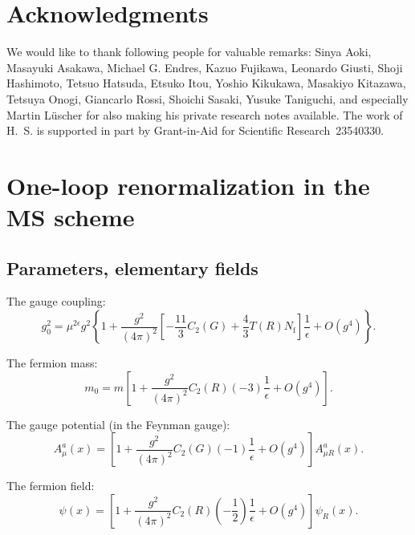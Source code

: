 \section*{Acknowledgments}
We would like to thank following people for valuable remarks:
Sinya Aoki,
Masayuki Asakawa,
Michael G. Endres,
Kazuo Fujikawa,
Leonardo Giusti,
Shoji Hashimoto,
Tetsuo Hatsuda,
Etsuko Itou,
Yoshio Kikukawa,
Masakiyo Kitazawa,
Tetsuya Onogi,
Giancarlo Rossi,
Shoichi Sasaki,
Yusuke Taniguchi,
and especially
Martin L\"uscher
for also making his private research notes available.
The work of H.~S. is supported in part by Grant-in-Aid for Scientific
Research~23540330.

\appendix

\section{One-loop renormalization in the MS scheme}
\label{sec:A}
\subsection{Parameters, elementary fields}
The gauge coupling:
\begin{equation}
   g_0^2=\mu^{2\epsilon}g^2
   \left\{
   1+\frac{g^2}{(4\pi)^2}\left[-\frac{11}{3}C_2(G)+\frac{4}{3}T(R)N_{\mathrm{f}}\right]
   \frac{1}{\epsilon}+O(g^4)
   \right\}.
\label{eq:(A1)}
\end{equation}


The fermion mass:
\begin{equation}
   m_0=m
   \left[
   1+\frac{g^2}{(4\pi)^2}C_2(R)(-3)
   \frac{1}{\epsilon}+O(g^4)
   \right].
\label{eq:(A2)}
\end{equation}

The gauge potential (in the Feynman gauge):
\begin{equation}
   A_\mu^a(x)=\left[1+\frac{g^2}{(4\pi)^2}C_2(G)(-1)
   \frac{1}{\epsilon}+O(g^4)\right]A_{\mu R}^a(x).
\label{eq:(A3)}
\end{equation}

The fermion field:
\begin{equation}
   \psi(x)=
   \left[1+\frac{g^2}{(4\pi)^2}C_2(R)\left(-\frac{1}{2}\right)
   \frac{1}{\epsilon}+O(g^4)\right]
   \psi_R(x).
\label{eq:(A4)}
\end{equation}

